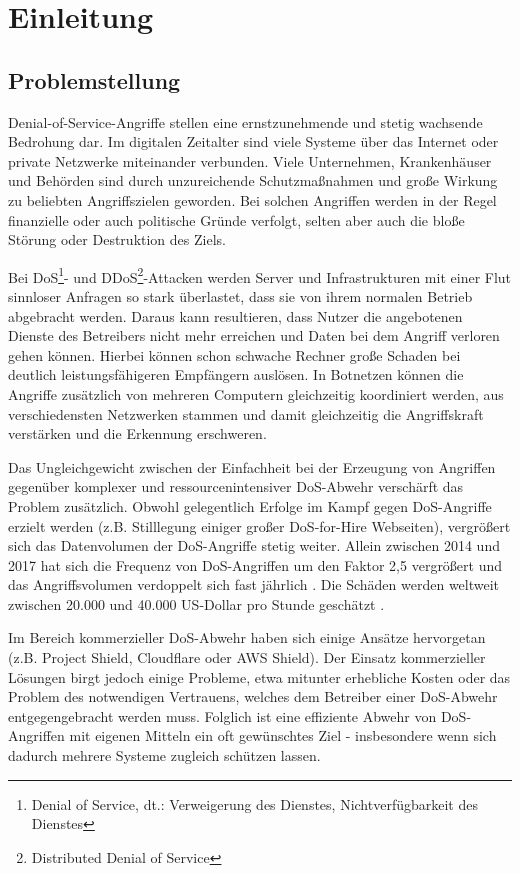 \documentclass[../review_3.tex]{subfiles}
\begin{document}
\chapter{Einleitung}\thispagestyle{fancy}

\section{Problemstellung}
Denial-of-Service-Angriffe stellen eine ernstzunehmende und stetig wachsende Bedrohung dar.
Im digitalen Zeitalter sind viele Systeme über das Internet oder private Netzwerke miteinander verbunden. Viele Unternehmen, Krankenhäuser und Behörden sind durch unzureichende Schutzmaßnahmen und große Wirkung zu beliebten Angriffszielen geworden\cite{infopoint_security_cyber_angriffe}. Bei solchen Angriffen werden in der Regel finanzielle oder auch politische Gründe verfolgt, selten aber auch die bloße Störung oder Destruktion des Ziels.

Bei DoS\footnote{Denial of Service, dt.: Verweigerung des Dienstes, Nichtverfügbarkeit des Dienstes}- und DDoS\footnote{Distributed Denial of Service}-Attacken werden Server und Infrastrukturen mit einer Flut sinnloser Anfragen so stark überlastet, dass sie von ihrem normalen Betrieb abgebracht werden. Daraus kann resultieren, dass Nutzer die angebotenen Dienste des Betreibers nicht mehr erreichen und Daten bei dem Angriff verloren gehen können.
Hierbei können schon schwache Rechner große Schaden bei deutlich leistungsfähigeren Empfängern auslösen. In Botnetzen können die Angriffe zusätzlich von mehreren Computern gleichzeitig koordiniert werden, aus verschiedensten Netzwerken stammen \cite{tecchannel_gefahr_botnet} und damit gleichzeitig die Angriffskraft verstärken und die Erkennung erschweren.

Das Ungleichgewicht zwischen der Einfachheit bei der Erzeugung von Angriffen gegenüber komplexer und ressourcenintensiver DoS-Abwehr verschärft das Problem zusätzlich. Obwohl gelegentlich Erfolge im Kampf gegen DoS-Angriffe erzielt werden (z.B. Stilllegung einiger großer \glqq DoS-for-Hire\grqq{} Webseiten), vergrößert sich das Datenvolumen der DoS-Angriffe stetig weiter. Allein zwischen 2014 und 2017 hat sich die Frequenz von DoS-Angriffen um den Faktor 2,5 vergrößert und das Angriffsvolumen verdoppelt sich fast jährlich \cite{neustar_ddos_report}. Die Schäden werden weltweit zwischen 20.000 und 40.000 US-Dollar pro Stunde geschätzt \cite{datacenterknowledge_study}.

Im Bereich kommerzieller DoS-Abwehr haben sich einige Ansätze hervorgetan (z.B. Project Shield\cite{projectshield}, Cloudflare\cite{cloudflare} oder AWS Shield\cite{aws_shield}). Der Einsatz kommerzieller Lösungen birgt jedoch einige Probleme, etwa mitunter erhebliche Kosten oder das Problem des notwendigen Vertrauens, welches dem Betreiber einer DoS-Abwehr entgegengebracht werden muss. Folglich ist eine effiziente Abwehr von DoS-Angriffen mit eigenen Mitteln ein oft gewünschtes Ziel - insbesondere wenn sich dadurch mehrere Systeme zugleich schützen lassen.
\end{document}
